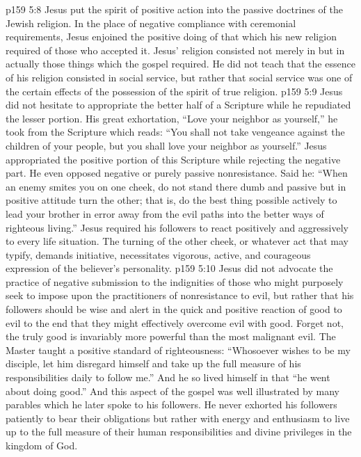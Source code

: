\vs p159 5:8 Jesus put the spirit of positive action into the passive doctrines of the Jewish religion. In the place of negative compliance with ceremonial requirements, Jesus enjoined the positive doing of that which his new religion required of those who accepted it. Jesus’ religion consisted not merely in  but in actually  those things which the gospel required. He did not teach that the essence of his religion consisted in social service, but rather that social service was one of the certain effects of the possession of the spirit of true religion.
\vs p159 5:9 Jesus did not hesitate to appropriate the better half of a Scripture while he repudiated the lesser portion. His great exhortation, \textcolor{ubdarkred}{“Love your neighbor as yourself,”} he took from the Scripture which reads: “You shall not take vengeance against the children of your people, but you shall love your neighbor as yourself.” Jesus appropriated the positive portion of this Scripture while rejecting the negative part. He even opposed negative or purely passive nonresistance. Said he: \textcolor{ubdarkred}{“When an enemy smites you on one cheek, do not stand there dumb and passive but in positive attitude turn the other; that is, do the best thing possible actively to lead your brother in error away from the evil paths into the better ways of righteous living.”} Jesus required his followers to react positively and aggressively to every life situation. The turning of the other cheek, or whatever act that may typify, demands initiative, necessitates vigorous, active, and courageous expression of the believer’s personality.
\vs p159 5:10 Jesus did not advocate the practice of negative submission to the indignities of those who might purposely seek to impose upon the practitioners of nonresistance to evil, but rather that his followers should be wise and alert in the quick and positive reaction of good to evil to the end that they might effectively overcome evil with good. Forget not, the truly good is invariably more powerful than the most malignant evil. The Master taught a positive standard of righteousness: \textcolor{ubdarkred}{“Whosoever wishes to be my disciple, let him disregard himself and take up the full measure of his responsibilities daily to follow me.”} And he so lived himself in that “he went about doing good.” And this aspect of the gospel was well illustrated by many parables which he later spoke to his followers. He never exhorted his followers patiently to bear their obligations but rather with energy and enthusiasm to live up to the full measure of their human responsibilities and divine privileges in the kingdom of God.\plusone
